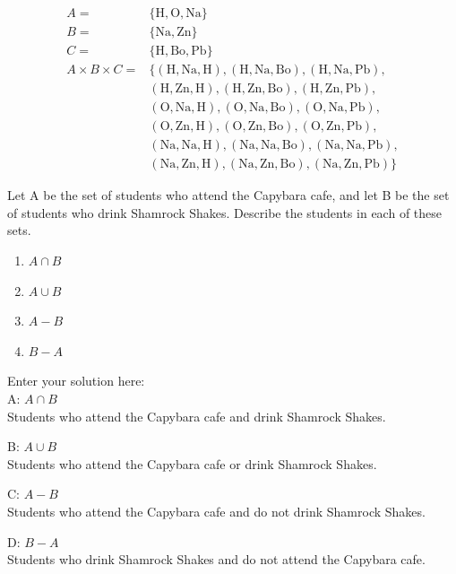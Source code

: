 \documentclass[10pt]{exam}
\begin{document}
\begin{questions}
\begin{solution}
\begin{align*}
    A = &\{\text{H}, \text{O}, \text{Na}\}\\
    B = &\{\text{Na}, \text{Zn}\}\\
    C = &\{\text{H}, \text{Bo}, \text{Pb}\}\\
    A \times B \times C = &\{(\text{H},\text{Na},\text{H}),(\text{H},\text{Na},\text{Bo}),(\text{H},\text{Na},\text{Pb}), \\
                            &(\text{H},\text{Zn},\text{H}),(\text{H},\text{Zn},\text{Bo}),(\text{H},\text{Zn},\text{Pb}), \\
                            &(\text{O},\text{Na},\text{H}),(\text{O},\text{Na},\text{Bo}),(\text{O},\text{Na},\text{Pb}), \\
                            &(\text{O},\text{Zn},\text{H}),(\text{O},\text{Zn},\text{Bo}),(\text{O},\text{Zn},\text{Pb}), \\
                            &(\text{Na},\text{Na},\text{H}),(\text{Na},\text{Na},\text{Bo}),(\text{Na},\text{Na},\text{Pb}), \\
                            &(\text{Na},\text{Zn},\text{H}),(\text{Na},\text{Zn},\text{Bo}),(\text{Na},\text{Zn},\text{Pb})\}
    \end{align*}
\end{solution}

\question[8] Let A be the set of students who attend the Capybara cafe, and let B be the set of students who drink Shamrock Shakes. Describe the students in each of these sets.
\begin{enumerate} [label=(\alph*)]
    \item $A \cap B$
    \item $A \cup B$
    \item $A - B$
    \item $B - A$
\end{enumerate}

\begin{solution}
    Enter your solution here:\\
    A: $A \cap B$\\
    Students who attend the Capybara cafe and drink Shamrock Shakes.
    
    B: $A \cup B$\\
    Students who attend the Capybara cafe or drink Shamrock Shakes.
    
    C: $A - B$\\
    Students who attend the Capybara cafe and do not drink Shamrock Shakes.
    
    D: $B - A$\\
    Students who drink Shamrock Shakes and do not attend the Capybara cafe. 
\end{solution}


\end{questions}
\end{document}
